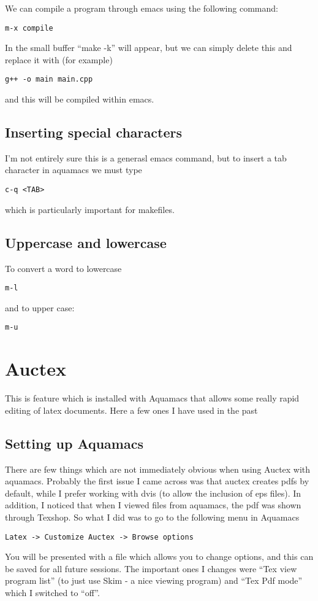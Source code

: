 \documentclass[a4paper, 10pt]{article}
\begin{document}
We can compile a program through emacs using the following command:
\begin{verbatim}
m-x compile
 \end{verbatim}
In the small buffer ``make -k'' will appear, but we can simply delete this and replace it with (for example) 
\begin{verbatim}
g++ -o main main.cpp
 \end{verbatim}
and this will be compiled within emacs.
 
\subsection*{Inserting special characters}

I'm not entirely sure this is a generasl emacs command, but to insert a tab character in aquamacs we must type
\begin{verbatim}
c-q <TAB>
 \end{verbatim}
which is particularly important for makefiles.  

\subsection*{Uppercase and lowercase}
\label{sec:uppercase-lowercase}

To convert a word to lowercase
\begin{verbatim}
m-l
\end{verbatim}
and to upper case:
\begin{verbatim}
m-u
\end{verbatim}

 \section*{Auctex}
 
This is feature which is installed with Aquamacs that allows some really rapid editing of latex documents. Here a few ones I have used in the past

\subsection*{Setting up Aquamacs}
There are few things which are not immediately obvious when using Auctex with aquamacs. Probably the first issue I came across was that auctex creates pdfs by default, while I prefer working with dvis (to allow the inclusion of eps files). In addition, I noticed that when I viewed files from aquamacs, the pdf was shown through Texshop. So what I did was to go to the following menu in Aquamacs
\begin{verbatim}
Latex -> Customize Auctex -> Browse options
\end{verbatim}
You will be presented with a file which allows you to change options, and this can be saved for all future sessions. The important ones I changes were ``Tex view program list'' (to just use Skim - a nice viewing program) and ``Tex Pdf mode'' which I switched to ``off''.
\end{document}
